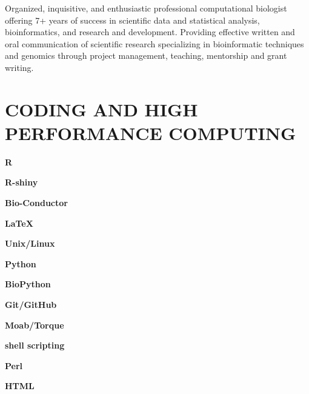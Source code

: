\documentclass[paper=a4,fontsize=11pt]{scrartcl}	 			%
\newcommand{\sepspace}{\vspace*{1em}}			%
\newcommand{\NewPart}[1]{\section*{\uppercase{#1}}}
\newcommand{\EducationEntry}[4]{
		\noindent \textbf{#1} \hfill 					%
		\colorbox{White}{%
			\parbox{10em}{%
			\hfill\color{Black}#2}} \par				%
		\noindent \textit{#3} \par					%
		\noindent\hangindent=2em\hangafter=0 \small #4 	%
		\normalsize \par}
\newcommand{\codeEntry}[2]{						%
		\noindent \textbf{#1} \hfill 					%
		\colorbox{White}{\color{Black}#2} \par		%
		}
\begin{document}
%
%

\noindent Organized, inquisitive, and enthusiastic professional computational biologist offering 7+ years of success in scientific data and statistical analysis, bioinformatics, and research and development. Providing effective written and oral communication of scientific research specializing in bioinformatic techniques and genomics through project management, teaching, mentorship and grant writing. 

\NewPart{Coding and High Performance Computing}
\begin{multicols}{3}
	
	\codeEntry{R}{}
	\codeEntry{R-shiny}{}
	\codeEntry{Bio-Conductor}{}
	\codeEntry{\LaTeX}{}
	\codeEntry{Unix/Linux}{}
	\codeEntry{Python}{}
	\codeEntry{BioPython}{}
	\codeEntry{Git/GitHub}{}
	\codeEntry{Moab/Torque}{}
	\codeEntry{shell scripting}{}
	\codeEntry{Perl}{}
	\codeEntry{HTML}{}
\end{multicols}
\end{document}
